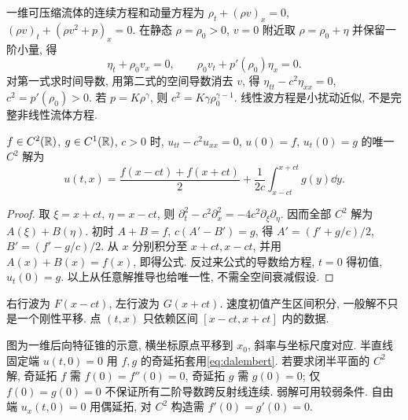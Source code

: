 \label{ch:wave}
一维可压缩流体的连续方程和动量方程为 $\rho_t+(\rho v)_x=0$, $(\rho v)_t+(\rho v^2+p)_x=0$. 在静态 $\rho=\rho_0>0$, $v=0$ 附近取 $\rho=\rho_0+\eta$ 并保留一阶小量, 得
\[
\eta_t+\rho_0v_x=0,\qquad \rho_0v_t+p'(\rho_0)\eta_x=0.
\]
对第一式求时间导数, 用第二式的空间导数消去 $v$, 得 $\eta_{tt}-c^2\eta_{xx}=0$, $c^2=p'(\rho_0)>0$. 若 $p=K\rho^\gamma$, 则 $c^2=K\gamma\rho_0^{\gamma-1}$. 线性波方程是小扰动近似, 不是完整非线性流体方程.
\begin{theorem}[d'Alembert 公式]\label{thm:dalembert}
$f\in C^2(\mathbb R)$, $g\in C^1(\mathbb R)$, $c>0$ 时, $u_{tt}-c^2u_{xx}=0$, $u(0)=f$, $u_t(0)=g$ 的唯一 $C^2$ 解为
\begin{equation}\label{eq:dalembert}
u(t,x)=\frac{f(x-ct)+f(x+ct)}2+\frac1{2c}\int_{x-ct}^{x+ct}g(y)\dd y.
\end{equation}
\end{theorem}
\begin{proof}
取 $\xi=x+ct$, $\eta=x-ct$, 则 $\partial_t^2-c^2\partial_x^2=-4c^2\partial_\xi\partial_\eta$. 因而全部 $C^2$ 解为 $A(\xi)+B(\eta)$. 初时 $A+B=f$, $c(A'-B')=g$, 得 $A'=(f'+g/c)/2$, $B'=(f'-g/c)/2$. 从 $x$ 分别积分至 $x+ct,x-ct$, 并用 $A(x)+B(x)=f(x)$, 即得公式. 反过来公式的导数给方程, $t=0$ 得初值, $u_t(0)=g$. 以上从任意解推导也给唯一性, 不需全空间衰减假设.
\end{proof}
右行波为 $F(x-ct)$, 左行波为 $G(x+ct)$. 速度初值产生区间积分, 一般解不只是一个刚性平移. 点 $(t,x)$ 只依赖区间 $[x-ct,x+ct]$ 内的数据.
\begin{center}
\end{center}
图为一维后向特征锥的示意, 横坐标原点平移到 $x_0$, 斜率与坐标尺度对应.
半直线固定端 $u(t,0)=0$ 用 $f,g$ 的奇延拓套用\eqref{eq:dalembert}. 若要求闭半平面的 $C^2$ 解, 奇延拓 $f$ 需 $f(0)=f''(0)=0$, 奇延拓 $g$ 需 $g(0)=0$; 仅 $f(0)=g(0)=0$ 不保证所有二阶导数跨反射线连续. 弱解可用较弱条件. 自由端 $u_x(t,0)=0$ 用偶延拓, 对 $C^2$ 构造需 $f'(0)=g'(0)=0$.

